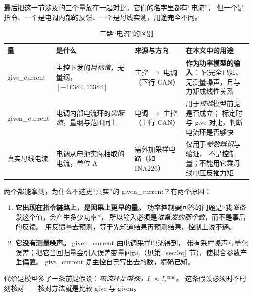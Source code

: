 \documentclass[cn,blue,11pt,device=normal]{elegantnote}
\newcommand{\Itau}{I_{\tau}{}}
\begin{document}
最后把这一节涉及的三个量放在一起对比。它们的名字里都有“电流”，
但一个是指令、一个是电调内部的反馈、一个是母线实测，用途完全不同。

\begin{table}[htbp]
  \centering
  \small
  \caption{三路“电流”的区别}
  \label{tab:threecurrents}
  \begin{tabular}{@{}>{\raggedright\arraybackslash}p{}>{\raggedright\arraybackslash}p{}>{\raggedright\arraybackslash}p{}>{\raggedright\arraybackslash}p{}@{}}
    \toprule
    量 & 是什么 & 来源与方向 & 在本文中的用途 \\
    \midrule
    give\_current & 主控下发的\emph{目标值}，无量纲，$[-16384,16384]$ &
    主控 $\to$ 电调（下行 CAN） & \textbf{作为功率模型的输入}：
    它完全已知、无测量噪声，且与力矩成线性关系 \\[4pt]
    given\_current & 电调内部电流环的\emph{实际值}，量纲与范围同上 &
    电调 $\to$ 主控（上行 CAN） & 用于\emph{校验}模型前提是否成立；
    标定时与 give 对比，判断电流环是否够快 \\[4pt]
    真实母线电流 & 电调从电池实际抽取的电流，单位 A &
    需外加采样电路（如 INA226） & 仅用于\emph{参数辨识}与验证，
    不是控制量；不能用它乘母线电压反推力矩 \\
    \bottomrule
  \end{tabular}
\end{table}

\begin{remark}
两个都能拿到，为什么不选更“真实”的 given\_current？有两个原因：

\begin{enumerate}
  \item \textbf{它出现在指令链路上，是因果上更早的量。}
  功率控制要回答的问题是“我\emph{准备}发这个值，会产生多少功率”，
  所以输入必须是\emph{准备发的那个数}，而不是事后的反馈。
  用反馈量去预测，等于先知道结果再预测结果，控制上说不通。
  \item \textbf{它没有测量噪声。} given\_current 由电调采样电流得到，
  带有采样噪声与量化误差；把它当回归量会引入误差变量问题
  （见第~\ref{sec:lsq} 节），使拟合参数产生偏置。
  give\_current 是主控自己写出去的数，精确已知。
\end{enumerate}

代价是模型多了一条前提假设：\emph{电流环足够快，$ \Itau \approx \Itau^{\mathrm{cmd}} $}。
这条假设必须时不时刻核对——核对方法就是比较 give 与 given。
\end{remark}
\end{document}
